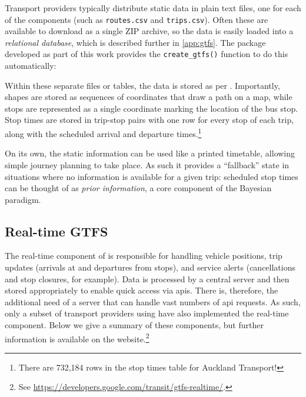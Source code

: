Transport providers typically distribute static \GTFS{} data in plain text files, one for each of the components (such as \verb+routes.csv+ and \verb+trips.csv+). Often these are available to download as a single ZIP archive, so the data is easily loaded into a \emph{relational database}, which is described further in \cref{app:gtfs}. The \Rstats{} package developed as part of this work provides the \verb+create_gtfs()+ function to do this automatically:
\begin{knitrout}\small
{}\color{fgcolor}\begin{kframe}
\begin{alltt}
 \hlkwb{<-} \hlstd{(}\hlstd{,}  \hlstd{=} \hlstd{)}
\end{alltt}
\end{kframe}
\end{knitrout}


Within these separate files or tables, the data is stored as per \GTFS{}. Importantly, shapes are stored as sequences of coordinates that draw a path on a map, while stops are represented as a single coordinate marking the location of the bus stop. Stop times are stored in trip-stop pairs with one row for every stop of each trip, along with the scheduled arrival and departure times.\footnote{There are 732,184 rows in the stop times table for Auckland Transport!}



On its own, the static \GTFS{} information can be used like a printed timetable, allowing simple journey planning to take place. As such it provides a ``fallback'' state in situations where no \rt{} information is available for a given trip: scheduled stop times can be thought of as \emph{prior information}, a core component of the Bayesian paradigm.



\subsection{Real-time GTFS}
\label{sec:gtfs_rt}

The real-time component of \GTFS{} is responsible for handling vehicle positions, trip updates (arrivals at and departures from stops), and service alerts (cancellations and stop closures, for example). Data is processed by a central server and then stored appropriately to enable quick access via \glspl{api}. There is, therefore, the additional need of a server that can handle vast numbers of \gls{api} requests. As such, only a subset of transport providers using \GTFS{} have also implemented the real-time component. Below we give a summary of these components, but further information is available on the \GTFS{} website.\footnote{See \url{https://developers.google.com/transit/gtfs-realtime/}.}


